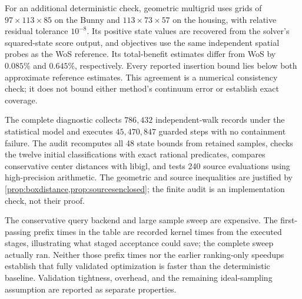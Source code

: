 For an additional deterministic check, geometric multigrid uses grids of
$97\times113\times85$ on the Bunny and $113\times73\times57$ on the
housing, with relative residual tolerance $10^{-8}$. Its positive state
values are recovered from the solver's squared-state score output, and
objectives use the same independent spatial probes as the WoS reference.
Its total-benefit estimates differ from WoS by $0.085\%$ and $0.645\%$,
respectively. Every reported insertion bound lies below both approximate
reference estimates. This agreement is a numerical consistency check; it
does not bound either method's continuum error or establish exact coverage.

The complete diagnostic collects $786{,}432$ independent-walk records under
the statistical model and executes $45{,}470{,}847$ guarded steps with no
containment failure. The audit recomputes all 48 state bounds from retained
samples, checks the twelve initial classifications with exact rational
predicates, compares conservative center distances with libigl, and tests
240 source evaluations using high-precision arithmetic. The geometric and
source inequalities are justified by \cref{prop:boxdistance,prop:sourcesenclosed};
the finite audit is an implementation check, not their proof.

The conservative query backend and large sample sweep are expensive. The
first-passing prefix times in the table are recorded kernel times from the
executed stages, illustrating what staged acceptance could save; the complete
sweep actually ran. Neither those prefix times nor the earlier ranking-only
speedups establish that fully validated optimization is faster than the
deterministic baseline. Validation tightness, overhead, and the remaining
ideal-sampling assumption are reported as separate properties.
